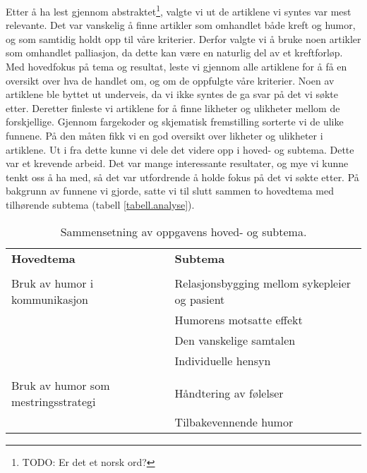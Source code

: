 Etter å ha lest gjennom abstraktet\footnote{TODO: Er det et norsk ord?}, valgte
vi ut de artiklene vi syntes var mest relevante. Det var vanskelig å finne
artikler som omhandlet både kreft og humor, og som samtidig holdt opp til våre
kriterier. Derfor valgte vi å bruke noen artikler som omhandlet palliasjon, da
dette kan være en naturlig del av et kreftforløp. Med hovedfokus på tema og
resultat, leste vi gjennom alle artiklene for å få en oversikt over hva de
handlet om, og om de oppfulgte våre kriterier. Noen av artiklene ble byttet ut
underveis, da vi ikke syntes de ga svar på det vi søkte etter. Deretter
finleste vi artiklene for å finne likheter og ulikheter mellom de forskjellige.
Gjennom fargekoder og skjematisk fremstilling sorterte vi de ulike funnene. På
den måten fikk vi en god oversikt over likheter og ulikheter i artiklene. Ut i
fra dette kunne vi dele det videre opp i hoved- og subtema. Dette var et
krevende arbeid. Det var mange interessante resultater, og mye vi kunne tenkt
oss å ha med, så det var utfordrende å holde fokus på det vi søkte etter. På
bakgrunn av funnene vi gjorde, satte vi til slutt sammen to hovedtema med
tilhørende subtema (tabell \vref{tabell.analyse}).

\begin{table}
  \centering
  \begin{tabularx}{\textwidth}{>{\raggedright\arraybackslash}X >{\raggedright\arraybackslash}X}
    \textbf{Hovedtema} & \textbf{Subtema} \\
    \\
    Bruk av humor i kommunikasjon
      & Relasjonsbygging mellom sykepleier og pasient \\
      & Humorens motsatte effekt \\
      & Den vanskelige samtalen \\
      & Individuelle hensyn \\
    \\
    Bruk av humor som mestringsstrategi
      & Håndtering av følelser \\
      & Tilbakevennende humor
  \end{tabularx}
  \label{tabell.analyse}
  \caption{Sammensetning av oppgavens hoved- og subtema.}
\end{table}
